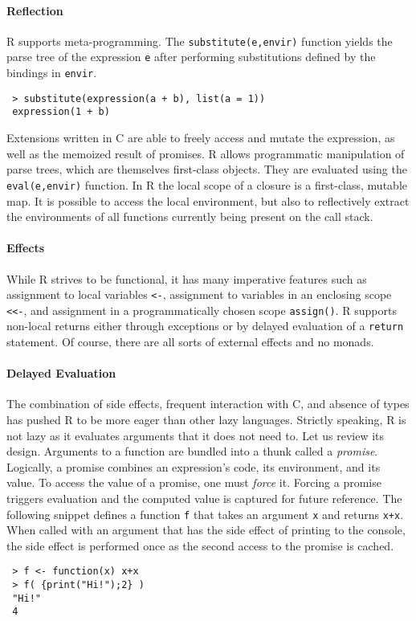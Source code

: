 \documentclass[review,nonacm,screen,acmsmall,anonymous=true]{acmart}
\newcommand{\code}[1]{\lstinline |#1|\xspace}
\begin{document}
\paragraph{Reflection}
R supports meta-programming. The \code{substitute(e,envir)}
function yields the parse tree of the expression \code{e} after performing
substitutions defined by the bindings in \code{envir}.
\vspace{-1mm}
\begin{lstlisting}
 > substitute(expression(a + b), list(a = 1))
 expression(1 + b)
\end{lstlisting}
\noindent
Extensions written in C are able to freely access and mutate the expression, as
well as the memoized result of promises. R allows programmatic manipulation of
parse trees, which are themselves first-class objects. They are evaluated using
the \code{eval(e,envir)} function. In R the local scope of a closure is a
first-class, mutable map. It is possible to access the local environment, but
also to reflectively extract the environments of all functions currently being
present on the call stack.

\paragraph{Effects} While R strives to be functional, it has many imperative
features such as assignment to local variables \code{<-}, assignment to
variables in an enclosing scope \code{<<-}, and assignment in a programmatically
chosen scope \code{assign()}. R supports non-local returns either through
exceptions or by delayed evaluation of a \code{return} statement. Of course,
there are all sorts of external effects and no monads.

\paragraph{Delayed Evaluation}

The combination of side effects, frequent interaction with C, and absence of
types has pushed R to be more eager than other lazy languages. Strictly
speaking, R is not lazy as it evaluates arguments that it does not need to. Let
us review its design. Arguments to a function are bundled into a thunk called a
\emph{promise}. Logically, a promise combines an expression's code, its
environment, and its value. To access the value of a promise, one must
\emph{force} it. Forcing a promise triggers evaluation and the computed value is
captured for future reference. The following snippet defines a function \code{f}
that takes an argument \code x and returns \code{x+x}. When called with an argument
that has the side effect of printing to the console, the side effect is
performed once as the second access to the promise is cached.
\begin{lstlisting}
 > f <- function(x) x+x
 > f( {print("Hi!");2} )
 "Hi!"
 4
\end{lstlisting}
\end{document}
